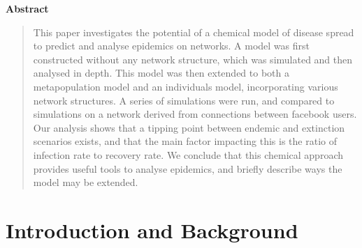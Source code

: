 \documentclass[12pt,a4paper,openany,twoside]{book}
\begin{document}
	
	\newpage
	
	\begin{center}
		\large\textbf{Abstract}
	\end{center}
	\begin{quote}
                This paper investigates the potential of a chemical model of disease spread to predict and analyse epidemics on networks. A model was first constructed without any network structure, which was simulated and then analysed in depth. This model was then extended to both a metapopulation model and an individuals model, incorporating various network structures. A series of simulations were run, and compared to simulations on a network derived from connections between facebook users. Our analysis shows that a tipping point between endemic and extinction scenarios exists, and that the main factor impacting this is the ratio of infection rate to recovery rate. We conclude that this chemical approach provides useful tools to analyse epidemics, and briefly describe ways the model may be extended.
	\end{quote}
	
	\newpage
	



	
	\setlength{\parskip}{0.2ex}
	\setcounter{tocdepth}{1}
	\renewcommand{\baselinestretch}{0.95}\normalsize
	\tableofcontents
	\renewcommand{\baselinestretch}{1}\normalsize
	\markboth{}{} 
	\setlength{\parskip}{1ex}
	

\mainmatter

\chapter{Introduction and Background}
\end{document}
